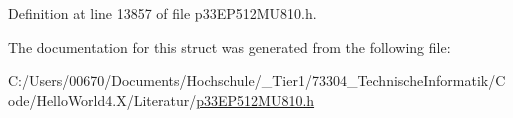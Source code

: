 Definition at line 13857 of file p33\+E\+P512\+M\+U810.\+h.



The documentation for this struct was generated from the following file\+:\begin{DoxyCompactItemize}
\item 
C\+:/\+Users/00670/\+Documents/\+Hochschule/\+\_\+\+Tier1/73304\+\_\+\+Technische\+Informatik/\+Code/\+Hello\+World4.\+X/\+Literatur/\hyperlink{p33_e_p512_m_u810_8h}{p33\+E\+P512\+M\+U810.\+h}\end{DoxyCompactItemize}
